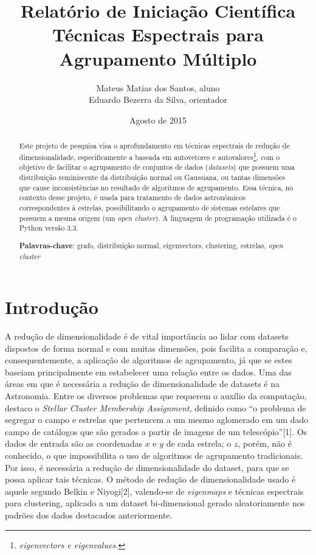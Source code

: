 \documentclass[a4paper,12pt]{article}    %
\title{Relatório de Iniciação Científica \\
Técnicas Espectrais para Agrupamento Múltiplo}
\author{Mateus Matias dos Santos, aluno \\
Eduardo Bezerra da Silva, orientador}
\date{Agosto de 2015}
\newcommand{\keywords}[1]{\par\noindent
{\small{\bf Palavras-chave\/}: #1}}
\begin{document}
\begin{titlepage}
\maketitle
\end{titlepage}

\begin{abstract}
Este projeto de pesquisa visa o aprofundamento em técnicas espectrais de redução de dimensionalidade, especificamente a baseada em autovetores e autovalores\footnote{\textit{eigenvectors e eigenvalues.}}, com o objetivo de facilitar o agrupamento de conjuntos de dados (\textit{datasets}) que possuem uma distribuição reminiscente da distribuição normal ou Gaussiana, ou tantas dimensões que cause inconsistências no resultado de algoritmos de agrupamento. Essa técnica, no contexto desse projeto, é usada para tratamento de dados astronômicos correspondentes à estrelas, possibilitando o agrupamento de sistemas estelares que possuem a mesma origem (um \textit{open cluster}). A linguagem de programação utilizada é o Python versão 3.3.

\keywords{grafo, distribuição normal, eigenvectors, clustering, estrelas, \textit{open cluster}}
\end{abstract}
\newpage

\tableofcontents
\newpage

\section{Introdução}

A redução de dimensionalidade é de vital importância ao lidar com datasets dispostos de forma normal e com muitas dimensões, pois facilita a comparação e, consequentemente, a aplicação de algoritmos de agrupamento, já que se estes baseiam principalmente em estabelecer uma relação entre os dados. Uma das áreas em que é necessária a redução de dimensionalidade de datasets é na Astronomia. Entre os diversos problemas que requerem o auxílio da computação, destaco o \textit{Stellar Cluster Membership Assignment}, definido como ``o problema de segregar o campo e estrelas que pertencem a um mesmo aglomerado em um dado campo de catálogos que são gerados a partir de imagens de um telescópio''[1]. Os dados de entrada são as coordenadas $x$ e $y$ de cada estrela; o $z$, porém, não é conhecido, o que impossibilita o uso de algoritmos de agrupamento tradicionais. Por isso, é necessária a redução de dimensionalidade do dataset, para que se possa aplicar tais técnicas. O método de redução de dimensionalidade usado é aquele segundo Belkin e Niyogi[2], valendo-se de \textit{eigenmaps} e técnicas espectrais para clustering, aplicado a um dataset bi-dimensional gerado aleatoriamente nos padrões dos dados destacados anteriormente.
\end{document}
